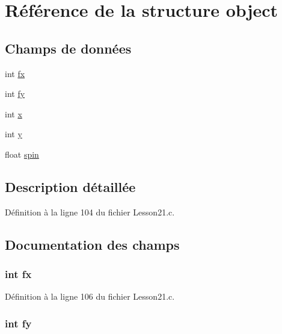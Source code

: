 \hypertarget{structobject}{}\section{Référence de la structure object}
\label{structobject}
\subsection*{Champs de données}
\begin{DoxyCompactItemize}
\item 
int \hyperlink{structobject_abf813aae411954e6f4ded8cf03b533a1}{fx}
\item 
int \hyperlink{structobject_aa2b3d35f37708cc501bfb3e33015edac}{fy}
\item 
int \hyperlink{structobject_a6150e0515f7202e2fb518f7206ed97dc}{x}
\item 
int \hyperlink{structobject_a0a2f84ed7838f07779ae24c5a9086d33}{y}
\item 
float \hyperlink{structobject_a62ab25ca0dac52cd5b575b88acbf69be}{spin}
\end{DoxyCompactItemize}


\subsection{Description détaillée}


Définition à la ligne 104 du fichier Lesson21.\+c.



\subsection{Documentation des champs}
\hypertarget{structobject_abf813aae411954e6f4ded8cf03b533a1}{}
\subsubsection[{fx}]{\setlength{\rightskip}{0pt plus 5cm}int fx}\label{structobject_abf813aae411954e6f4ded8cf03b533a1}


Définition à la ligne 106 du fichier Lesson21.\+c.

\hypertarget{structobject_aa2b3d35f37708cc501bfb3e33015edac}{}
\subsubsection[{fy}]{\setlength{\rightskip}{0pt plus 5cm}int fy}\label{structobject_aa2b3d35f37708cc501bfb3e33015edac}


